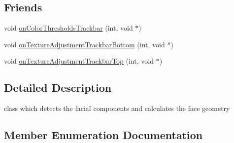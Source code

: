 \subsection*{Friends}
\begin{DoxyCompactItemize}
\item 
void \hyperlink{class_face3_d_1_1_detection_aa1df55e432668286b0705ca933e88be0}{on\+Color\+Thresholds\+Trackbar} (int, void $\ast$)
\item 
void \hyperlink{class_face3_d_1_1_detection_a83b038e3b7bdcd6905035f605cb09573}{on\+Texture\+Adjustment\+Trackbar\+Bottom} (int, void $\ast$)
\item 
void \hyperlink{class_face3_d_1_1_detection_a99b67e3274cb430d73791bfd4cf0cd8b}{on\+Texture\+Adjustment\+Trackbar\+Top} (int, void $\ast$)
\end{DoxyCompactItemize}


\subsection{Detailed Description}
class which detects the facial components and calculates the face geometry 

\subsection{Member Enumeration Documentation}

